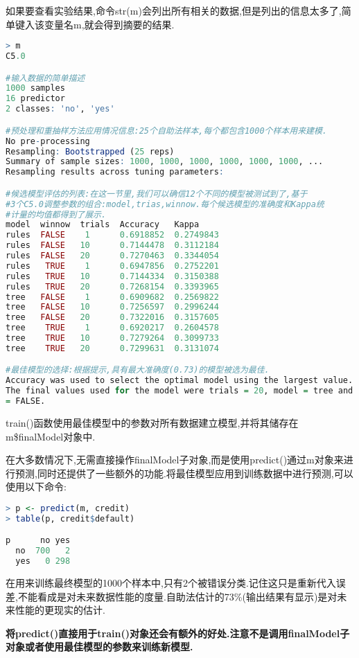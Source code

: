 \documentclass[11pt,a4paper,oneside]{book}
\begin{document}
如果要查看实验结果,命令str(m)会列出所有相关的数据,但是列出的信息太多了,简单键入该变量名m,就会得到摘要的结果.
\begin{lstlisting}[language=r]
> m
C5.0 

#输入数据的简单描述
1000 samples
16 predictor
2 classes: 'no', 'yes' 

#预处理和重抽样方法应用情况信息:25个自助法样本,每个都包含1000个样本用来建模.
No pre-processing
Resampling: Bootstrapped (25 reps) 
Summary of sample sizes: 1000, 1000, 1000, 1000, 1000, 1000, ... 
Resampling results across tuning parameters:

#候选模型评估的列表:在这一节里,我们可以确信12个不同的模型被测试到了,基于
#3个C5.0调整参数的组合:model,trias,winnow.每个候选模型的准确度和Kappa统
#计量的均值都得到了展示.
model  winnow  trials  Accuracy   Kappa    
rules  FALSE    1      0.6918852  0.2749843
rules  FALSE   10      0.7144478  0.3112184
rules  FALSE   20      0.7270463  0.3344054
rules   TRUE    1      0.6947856  0.2752201
rules   TRUE   10      0.7144334  0.3150388
rules   TRUE   20      0.7268154  0.3393965
tree   FALSE    1      0.6909682  0.2569822
tree   FALSE   10      0.7256597  0.2996244
tree   FALSE   20      0.7322016  0.3157605
tree    TRUE    1      0.6920217  0.2604578
tree    TRUE   10      0.7279264  0.3099733
tree    TRUE   20      0.7299631  0.3131074

#最佳模型的选择:根据提示,具有最大准确度(0.73)的模型被选为最佳.
Accuracy was used to select the optimal model using the largest value.
The final values used for the model were trials = 20, model = tree and winnow
= FALSE.
\end{lstlisting}

train()函数使用最佳模型中的参数对所有数据建立模型,并将其储存在m\$finalModel对象中.

在大多数情况下,无需直接操作finalModel子对象,而是使用predict()通过m对象来进行预测,同时还提供了一些额外的功能.将最佳模型应用到训练数据中进行预测,可以使用以下命令:
\begin{lstlisting}[language=r]
> p <- predict(m, credit)
> table(p, credit$default)

p      no yes
  no  700   2
  yes   0 298
\end{lstlisting}
在用来训练最终模型的1000个样本中,只有2个被错误分类.记住这只是重新代入误差,不能看成是对未来数据性能的度量.自助法估计的73\%(输出结果有显示)是对未来性能的更现实的估计.

\textbf{将predict()直接用于train()对象还会有额外的好处.注意不是调用finalModel子对象或者使用最佳模型的参数来训练新模型.}
\end{document}
